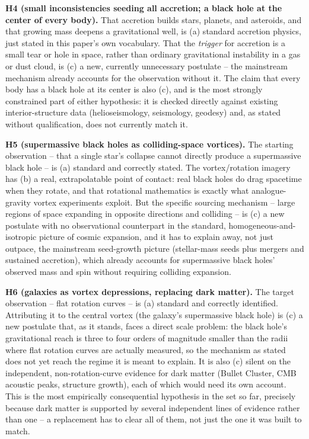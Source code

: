 \documentclass[12pt, a4paper]{article}
\begin{document}
\textbf{H4 (small inconsistencies seeding all accretion; a black hole
at the center of every body).} That accretion builds stars, planets,
and asteroids, and that growing mass deepens a gravitational well, is
(a) standard accretion physics, just stated in this paper's own
vocabulary. That the \emph{trigger} for accretion is a small tear or
hole in space, rather than ordinary gravitational instability in a
gas or dust cloud, is (c) a new, currently unnecessary postulate --
the mainstream mechanism already accounts for the observation without
it. The claim that every body has a black hole at its center is also
(c), and is the most strongly constrained part of either hypothesis:
it is checked directly against existing interior-structure data
(helioseismology, seismology, geodesy) and, as stated without
qualification, does not currently match it.

\textbf{H5 (supermassive black holes as colliding-space vortices).}
The starting observation -- that a single star's collapse cannot
directly produce a supermassive black hole -- is (a) standard and
correctly stated. The vortex/rotation imagery has (b) a real,
extrapolatable point of contact: real black holes do drag spacetime
when they rotate, and that rotational mathematics is exactly what
analogue-gravity vortex experiments exploit. But the specific sourcing
mechanism -- large regions of space expanding in opposite directions
and colliding -- is (c) a new postulate with no observational
counterpart in the standard, homogeneous-and-isotropic picture of
cosmic expansion, and it has to explain away, not just outpace, the
mainstream seed-growth picture (stellar-mass seeds plus mergers and
sustained accretion), which already accounts for supermassive black
holes' observed mass and spin without requiring colliding expansion.

\textbf{H6 (galaxies as vortex depressions, replacing dark matter).}
The target observation -- flat rotation curves -- is (a) standard and
correctly identified. Attributing it to the central vortex (the
galaxy's supermassive black hole) is (c) a new postulate that, as it
stands, faces a direct scale problem: the black hole's gravitational
reach is three to four orders of magnitude smaller than the radii
where flat rotation curves are actually measured, so the mechanism as
stated does not yet reach the regime it is meant to explain. It is
also (c) silent on the independent, non-rotation-curve evidence for
dark matter (Bullet Cluster, CMB acoustic peaks, structure growth),
each of which would need its own account. This is the most
empirically consequential hypothesis in the set so far, precisely
because dark matter is supported by several independent lines of
evidence rather than one -- a replacement has to clear all of them,
not just the one it was built to match.
\end{document}
